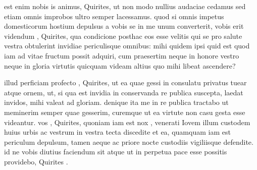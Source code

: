  est enim nobis is animus, Quirites, ut non modo nullius audaciae cedamus sed etiam omnis improbos ultro semper lacessamus. quod si omnis impetus domesticorum hostium depulsus a vobis se in me unum converterit, vobis erit videndum , Quirites, qua condicione posthac eos esse velitis qui se pro salute vestra obtulerint invidiae periculisque omnibus: mihi quidem ipsi quid est quod iam ad vitae fructum possit adquiri, cum praesertim neque in honore vestro neque in gloria virtutis quicquam videam altius quo mihi libeat ascendere?

 illud perficiam profecto , Quirites, ut ea quae gessi in consulatu privatus tuear atque ornem, ut, si qua est invidia in conservanda re publica suscepta, laedat invidos, mihi valeat ad gloriam. denique ita me in re publica tractabo ut meminerim semper quae gesserim, curemque ut ea virtute non casu gesta esse videantur. vos , Quirites, quoniam iam est nox , venerati Iovem illum custodem huius urbis ac vestrum in vestra tecta discedite et ea, quamquam iam est periculum depulsum, tamen aeque ac priore nocte custodiis vigiliisque defendite. id ne vobis diutius faciendum sit atque ut in perpetua pace esse possitis providebo, Quirites .
